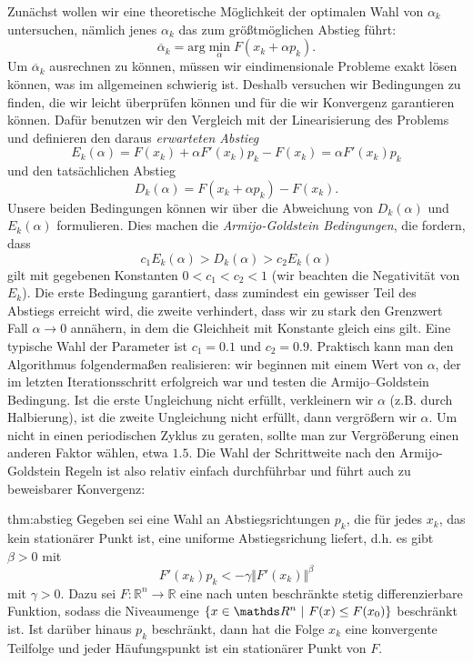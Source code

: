 Zun\"achst wollen wir eine theoretische M\"oglichkeit der optimalen Wahl von $\alpha_k$ untersuchen, n\"amlich jenes $\alpha_k$ das zum gr\"o{\ss}tm\"oglichen Abstieg f\"uhrt:
$$ \overline{\alpha}_k = \text{arg}\min_\alpha F(x_k + \alpha p_k). $$ 
Um $ \overline{\alpha}_k $ ausrechnen zu k\"onnen, m\"ussen wir eindimensionale Probleme exakt l\"osen k\"onnen, was im allgemeinen schwierig ist. Deshalb versuchen wir Bedingungen zu finden, die wir leicht \"uberpr\"ufen k\"onnen und f\"ur die wir Konvergenz garantieren k\"onnen. Daf\"ur benutzen wir den Vergleich mit der Linearisierung des Problems und definieren den daraus {\em erwarteten Abstieg}
\begin{equation} E_k(\alpha) = F(x_k) + \alpha  F'(x_k) p_k - F(x_k) = \alpha  F'(x_k) p_k \end{equation}
und den tatsächlichen Abstieg
\begin{equation} 
D_k(\alpha) = F(x_k  + \alpha   p_k) - F(x_k) .
\end{equation}
Unsere beiden Bedingungen k\"onnen wir \"uber die Abweichung von $D_k(\alpha)$ und $E_k(\alpha)$ formulieren. Dies machen die {\em Armijo-Goldstein Bedingungen}, die fordern, dass
\begin{equation} 
c_1  E_k(\alpha) > D_k(\alpha) > c_2 E_k(\alpha)  
\end{equation}
gilt mit gegebenen Konstanten $0 < c_1 < c_2 < 1$ (wir beachten die Negativit\"at von $E_k$). Die erste Bedingung garantiert, dass zumindest ein gewisser Teil des Abstiegs erreicht wird, die zweite verhindert, dass wir zu stark den Grenzwert Fall $\alpha \rightarrow 0$ ann\"ahern, in dem die Gleichheit mit Konstante gleich eins gilt. Eine typische Wahl der Parameter ist $c_1 =0.1$ und $c_2 = 0.9$. Praktisch kann man den Algorithmus folgendermaßen realisieren: wir beginnen mit einem Wert von $\alpha$, der im letzten Iterationsschritt erfolgreich war und testen die Armijo--Goldstein Bedingung. Ist die erste Ungleichung nicht erf\"ullt, verkleinern wir $\alpha$ (z.B. durch Halbierung), ist die zweite Ungleichung nicht erf\"ullt, dann vergrößern wir $\alpha$. Um nicht in einen periodischen Zyklus zu geraten, sollte man zur Vergrößerung einen anderen Faktor wählen, etwa $1.5$.
Die Wahl der Schrittweite nach den Armijo-Goldstein Regeln ist also relativ einfach durchführbar und führt auch zu beweisbarer Konvergenz:
%
\begin{theorem}{}{thm:abstieg}
Gegeben sei eine Wahl an Abstiegsrichtungen $p_k$, die für jedes $x_k$, das kein station\"arer Punkt ist, eine uniforme Abstiegsrichung liefert, d.h. es gibt $\beta > 0$ mit
$$ F'(x_k) p_k < - \gamma \Vert F'(x_k)  \Vert^\beta$$
mit $\gamma > 0$.
 Dazu sei $F: \mathbb{R}^n \rightarrow \mathbb{R}$ eine nach unten beschr\"ankte stetig differenzierbare Funktion, sodass die Niveaumenge $ \{ x \in \R^n ~|~ F(x) \leq F(x_0) \} $ beschr\"ankt ist. Ist dar\"uber hinaus $p_k$ beschr\"ankt, dann hat die Folge $x_k$ eine konvergente Teilfolge und jeder H\"aufungspunkt ist ein station\"arer Punkt von $F$.
\end{theorem} 
